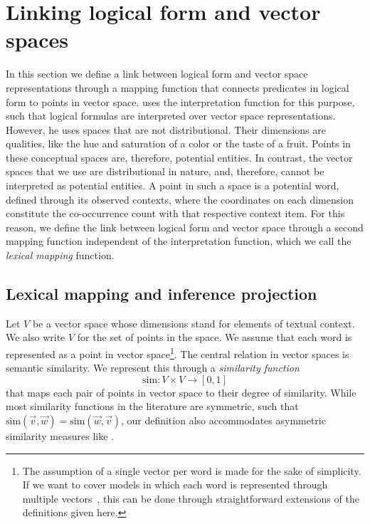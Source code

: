 \newcommand{\loglang}{\ensuremath{{\cal{L}}}\xspace}
\newcommand{\predsym}[1]{\ensuremath{{\cal{P}}_{#1}}\xspace}
\newcommand{\simfunc}{\ensuremath{\mathrm{sim}}}

\section{Linking logical form and vector spaces}
\label{sec:interface}

In this section we define a link between logical form and vector space
representations through a mapping function that connects predicates in logical
form to points in vector space. \citet{gardenfors:book2004} uses the
interpretation function for this purpose, such that logical formulas are
interpreted over vector space representations. However, he uses spaces
that are not distributional. Their dimensions are qualities, like the hue and saturation of a color or the taste of
a fruit. Points in these conceptual spaces are, therefore, potential entities. In
contrast, the vector spaces that we use are distributional in nature, and, therefore, cannot be interpreted as potential
entities. A point in such a space is a potential word, defined through
its observed contexts, where the coordinates on each dimension constitute the
co-occurrence count with that respective context item. For
this reason, we define the link between logical form and vector space through a
second mapping function independent of the interpretation function, which we
call the \emph{lexical mapping} function.

\subsection*{Lexical mapping and inference projection} 


Let $V$ be a vector space whose dimensions stand for elements of  textual
context. We also write $V$ for the set of points in the space. We assume that
each word is represented as a point in vector space\footnote{The assumption of a
single vector per word is made for the sake of simplicity. If we want to cover
models in which each word is represented through multiple
vectors~\citep{reisinger:naacl2010,dinu:emnlp2010}, this can be done through
straightforward extensions of the definitions given here.}.
The central relation in vector spaces is semantic similarity. We represent this
through a \textit{similarity function} \[\simfunc: V \times V \to [0,1] \] that
maps each pair of points in vector space to their degree of similarity. While
most similarity functions in the literature are symmetric, such that 
$\simfunc(\vec v, \vec w) = \simfunc(\vec w, \vec v)$, our definition also
accommodates asymmetric similarity measures like \citet{kotlerman:nlej2010}.

